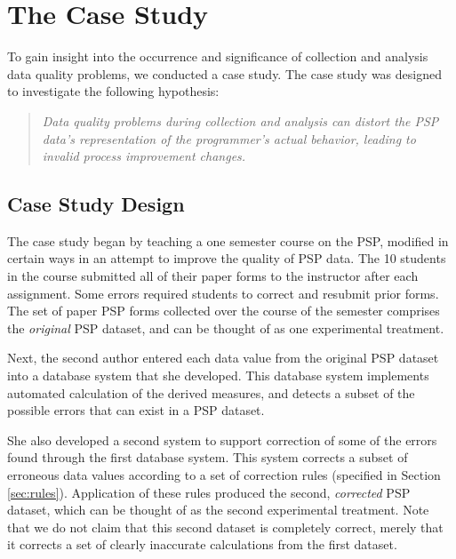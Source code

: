 

\section{The Case Study}
\label{sec:case-study}

To gain insight into the occurrence and significance of collection and
analysis data quality problems, we conducted a case study. The case
study was designed to investigate the following hypothesis:

\begin{quotation}

{\em Data quality problems during collection and analysis can distort the 
PSP data's representation of the programmer's actual behavior, leading to 
invalid process improvement changes.}

\end{quotation}


\subsection{Case Study Design}
\label{sec:design}

The case study began by teaching a one semester course on the PSP, modified
in certain ways in an attempt to improve the quality of PSP data.  The 10
students in the course submitted all of their paper forms to the instructor
after each assignment. Some errors required students to correct and
resubmit prior forms.  The set of paper PSP forms collected over the course
of the semester comprises the {\em original} PSP dataset, and can be
thought of as one experimental treatment.

Next, the second author entered each data value from the original PSP dataset into a
database system that she developed. This database system implements
automated calculation of the derived measures, and detects a subset of the
possible errors that can exist in a PSP dataset.

She also developed a second system to support correction of some of the errors
found through the first database system.  This system corrects a subset of
erroneous data values according to a set of correction rules (specified in
Section \ref{sec:rules}).  Application of these rules produced the second,
{\em corrected} PSP dataset, which can be thought of as the second
experimental treatment. Note that we do not claim that this second dataset
is completely correct, merely that it corrects a set of clearly inaccurate
calculations from the first dataset.

